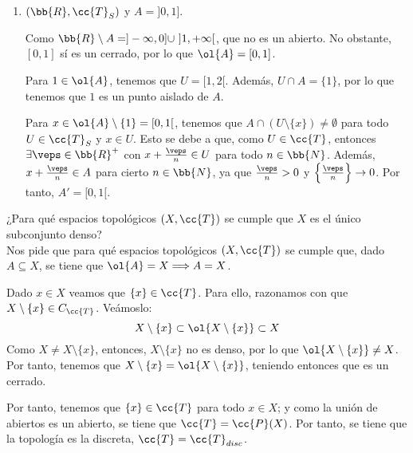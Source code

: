 \begin{ejercicio}
\begin{enumerate}
        Por tanto, tenemos que $A\cap U=A\cap [(X\setminus A)\cup \{x\}] = \{x\}$. Por tanto, tenemos que $x$ es un punto aislado de $A$. Es decir, todos los puntos de $A$ son aislados.

        Sea ahora $x\in X$, y veamos si es un punto de acumulación. Como todos los puntos de $A$ son aislados, tenemos que $x\notin A$. Además, como $A$ es finito, tenemos que $X\setminus A\in \cc{T}_{CF}$. Entonces:
        \begin{equation*}
            A\cap ((X\setminus A)\setminus \{x\})
            = A\cap (X\setminus (A\cup \{x\})) = \emptyset
        \end{equation*}
        
        Entonces, $x\notin A'$, y por tanto $A'=\emptyset$.
        
        
        \item $(\bb{R}, \cc{T}_S)$ y $A=]0,1]$.

        Como $\bb{R}\setminus A = ]-\infty, 0]\cup~]1,+\infty[$, que no es un abierto. No obstante, $[0,1]$ sí es un cerrado, por lo que $\ol{A}=[0,1]$.

        Para $1\in \ol{A}$, tenemos que $U=[1,2[$. Además, $U\cap A=\{1\}$, por lo que tenemos que $1$ es un punto aislado de $A$.

        Para $x\in \ol{A}\setminus \{1\}=[0,1[$, tenemos que $A\cap (U\setminus \{x\})\neq \emptyset$ para todo $U\in \cc{T}_S$ y $x\in U$. Esto se debe a que, como $U\in \cc{T}$, entonces $\exists \veps\in \bb{R}^+$ con $x+\frac{\veps}{n}\in U$ para todo $n\in \bb{N}$. Además, $x+\frac{\veps}{n}\in A$ para cierto $n\in \bb{N}$, ya que $\frac{\veps}{n}>0$ y $\left\{\frac{\veps}{n}\right\}\to 0$. Por tanto, $A'=[0,1[$.

        
    \end{enumerate}
\end{ejercicio}

\begin{ejercicio}
    ¿Para qué espacios topológicos $(X,\cc{T})$ se cumple que $X$ es el único subconjunto denso?\\

    Nos pide que para qué espacios topológicos $(X,\cc{T})$ se cumple que, dado $A\subseteq X$, se tiene que $\ol{A}=X\Longrightarrow A=X$.

    Dado $x\in X$ veamos que $\{x\}\in \cc{T}$. Para ello, razonamos con que ${X}\setminus \{x\}\in C_\cc{T}$. Veámoslo:
    \begin{equation*}
        X\setminus \{x\} \subset \ol{X\setminus \{x\}} \subset X
    \end{equation*}
    Como $X\neq X\setminus \{x\}$, entonces, $X\setminus \{x\}$ no es denso, por lo que $\ol{X\setminus \{x\}}\neq X$. Por tanto, tenemos que $X\setminus \{x\}=\ol{X\setminus \{x\}}$, teniendo entonces que es un cerrado. 

    Por tanto, tenemos que $\{x\}\in \cc{T}$ para todo $x\in X$; y como la unión de abiertos es un abierto, se tiene que $\cc{T}=\cc{P}(X)$. Por tanto, se tiene que la topología es la discreta, $\cc{T}=\cc{T}_{disc}$.
\end{ejercicio}

